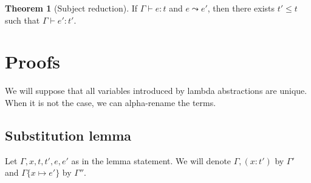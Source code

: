 \documentclass[a4paper]{article}%
\theoremstyle{definition}
\newtheorem{theorem}{Theorem}
\begin{document}
    \begin{theorem}[Subject reduction]
      If $\Gamma \vdash e : t$ and $e \leadsto e'$, then there exists $t' \leq t$ such that $\Gamma \vdash e' : t'$.
    \end{theorem}

    \section{Proofs}

    We will suppose that all variables introduced by lambda abstractions are unique. When it is not the case, we can alpha-rename the terms.


    \subsection{Substitution lemma}

    Let $\Gamma,x,t,t',e,e'$ as in the lemma statement.
    We will denote $\Gamma, (x:t')$ by $\Gamma'$ and $\Gamma\{x\mapsto e'\}$ by $\Gamma''$.
\end{document}
